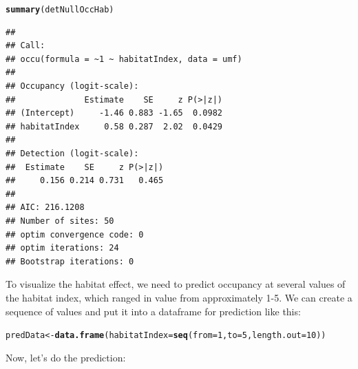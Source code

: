 \documentclass[12pt]{article}\usepackage[]{graphicx}\usepackage[]{color}
\makeatletter
\newcommand{\hlnum}[1]{\textcolor[rgb]{0.686,0.059,0.569}{#1}}%
\newcommand{\hlstd}[1]{\textcolor[rgb]{0.345,0.345,0.345}{#1}}%
\newcommand{\hlkwb}[1]{\textcolor[rgb]{0.69,0.353,0.396}{#1}}%
\newcommand{\hlkwc}[1]{\textcolor[rgb]{0.333,0.667,0.333}{#1}}%
\newcommand{\hlkwd}[1]{\textcolor[rgb]{0.737,0.353,0.396}{\textbf{#1}}}%
\newenvironment{kframe}{%
 \def\at@end@of@kframe{}%
 \ifinner\ifhmode%
  \def\at@end@of@kframe{\end{minipage}}%
  \begin{minipage}{\columnwidth}%
 \fi\fi%
 \def\FrameCommand##1{\hskip\@totalleftmargin \hskip-\fboxsep
 \colorbox{shadecolor}{##1}\hskip-\fboxsep
     \hskip-\linewidth \hskip-\@totalleftmargin \hskip\columnwidth}%
 \MakeFramed {\advance\hsize-\width
   \@totalleftmargin\z@ \linewidth\hsize
   \@setminipage}}%
 {\par\unskip\endMakeFramed%
 \at@end@of@kframe}
\newenvironment{knitrout}{}{} %
\makeatother
\begin{document}
\begin{knitrout}
\color{fgcolor}\begin{kframe}
\begin{alltt}
\hlkwd{summary}\hlstd{(detNullOccHab)}
\end{alltt}
\begin{verbatim}
## 
## Call:
## occu(formula = ~1 ~ habitatIndex, data = umf)
## 
## Occupancy (logit-scale):
##              Estimate    SE     z P(>|z|)
## (Intercept)     -1.46 0.883 -1.65  0.0982
## habitatIndex     0.58 0.287  2.02  0.0429
## 
## Detection (logit-scale):
##  Estimate    SE     z P(>|z|)
##     0.156 0.214 0.731   0.465
## 
## AIC: 216.1208 
## Number of sites: 50
## optim convergence code: 0
## optim iterations: 24 
## Bootstrap iterations: 0
\end{verbatim}
\end{kframe}
\end{knitrout}


To visualize the habitat effect, we need to predict occupancy at several values of the habitat index, which ranged in value from approximately 1-5. We can create a sequence of values and put it into a dataframe for prediction like this:

\begin{knitrout}
\color{fgcolor}\begin{kframe}
\begin{alltt}
\hlstd{predData} \hlkwb{<-} \hlkwd{data.frame}\hlstd{(}\hlkwc{habitatIndex}\hlstd{=}\hlkwd{seq}\hlstd{(}\hlkwc{from}\hlstd{=}\hlnum{1}\hlstd{,} \hlkwc{to}\hlstd{=}\hlnum{5}\hlstd{,} \hlkwc{length.out}\hlstd{=}\hlnum{10}\hlstd{))}
\end{alltt}
\end{kframe}
\end{knitrout}

Now, let's do the prediction:
\end{document}
